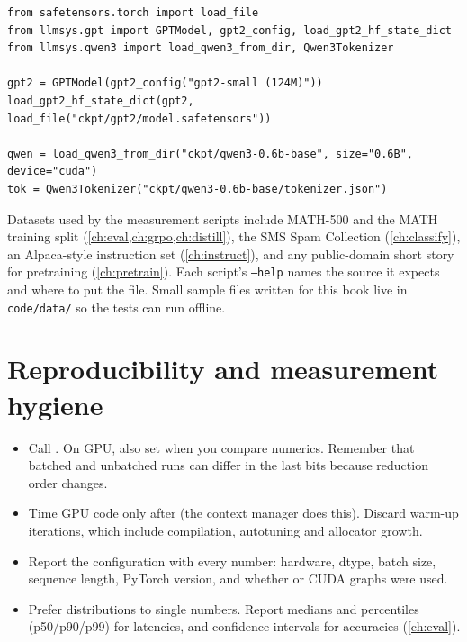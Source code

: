 \begin{lstlisting}[caption={Loading the downloaded checkpoints into our from-scratch modules.},label={lst:setup:load}]
from safetensors.torch import load_file
from llmsys.gpt import GPTModel, gpt2_config, load_gpt2_hf_state_dict
from llmsys.qwen3 import load_qwen3_from_dir, Qwen3Tokenizer

gpt2 = GPTModel(gpt2_config("gpt2-small (124M)"))
load_gpt2_hf_state_dict(gpt2, load_file("ckpt/gpt2/model.safetensors"))

qwen = load_qwen3_from_dir("ckpt/qwen3-0.6b-base", size="0.6B", device="cuda")
tok = Qwen3Tokenizer("ckpt/qwen3-0.6b-base/tokenizer.json")
\end{lstlisting}

Datasets used by the measurement scripts include MATH-500 and the MATH training split
(\cref{ch:eval,ch:grpo,ch:distill}), the SMS Spam Collection (\cref{ch:classify}), an
Alpaca-style instruction set (\cref{ch:instruct}), and any public-domain short story for
pretraining (\cref{ch:pretrain}). Each script's \texttt{--help} names the source it expects
and where to put the file. Small sample files written for this book live in \texttt{code/data/}
so the tests can run offline.

\section{Reproducibility and measurement hygiene}

\begin{itemize}
  \item Call . On GPU, also set
         when you compare numerics. Remember that
        batched and unbatched runs can differ in the last bits because reduction order changes.
  \item Time GPU code only after  (the 
        context manager does this). Discard warm-up iterations, which include compilation,
        autotuning and allocator growth.
  \item Report the configuration with every number: hardware, dtype, batch size, sequence
        length, PyTorch version, and whether  or CUDA graphs were used.
  \item Prefer distributions to single numbers. Report medians and percentiles (p50/p90/p99)
        for latencies, and confidence intervals for accuracies (\cref{ch:eval}).
\end{itemize}
